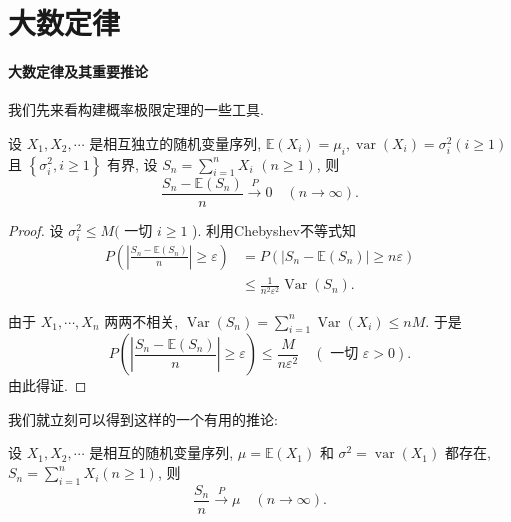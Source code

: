 \section{大数定律}
\paragraph{大数定律及其重要推论}

我们先来看构建概率极限定理的一些工具.

\begin{theorem} 
    设 $X_1, X_2, \cdots$ 是相互独立的随机变量序列, $\mathbb{E}\left(X_i\right)=\mu_i, \operatorname{var}\left(X_i\right)=\sigma_i^2(i \geq 1)$ 且 $\left\{\sigma_i^2, i \geq 1\right\}$ 有界, 设 $S_n=\sum_{i=1}^n X_i$ $(n \geq 1)$, 则
$$
\frac{S_n-\mathbb{E}\left(S_n\right)}{n} \stackrel{P}{\longrightarrow} 0 \quad(n \rightarrow \infty) .
$$
\end{theorem}

\begin{proof}
    设 $\sigma_i^2 \leq M($ 一切 $i \geq 1$ ). 利用Chebyshev不等式知
$$
\begin{aligned}
P\left(\left|\frac{S_n-\mathbb{E}\left(S_n\right)}{n}\right| \geq \varepsilon\right) & =P\left(\left|S_n-\mathbb{E}\left(S_n\right)\right| \geq n \varepsilon\right) \\
& \leq \frac{1}{n^2 \varepsilon^2} \operatorname{Var}\left(S_n\right) .
\end{aligned}
$$

由于 $X_1, \cdots, X_n$ 两两不相关, $\operatorname{Var}\left(S_n\right)=\sum_{i=1}^n \operatorname{Var}\left(X_i\right) \leq n M$. 于是
$$
P\left(\left|\frac{S_n-\mathbb{E}\left(S_n\right)}{n}\right| \geq \varepsilon\right) \leq \frac{M}{n \varepsilon^2} \quad(\text { 一切 } \varepsilon>0) .
$$
由此得证. 

\end{proof}

我们就立刻可以得到这样的一个有用的推论: 

\begin{corollary}
    设 $X_1, X_2, \cdots$ 是相互的随机变量序列, $\mu=\mathbb{E}\left(X_1\right)$ 和 $\sigma^2=\operatorname{var}\left(X_1\right)$ 都存在, $S_n=\sum_{i=1}^n X_i(n \geq 1)$, 则
    $$
    \frac{S_n}{n} \stackrel{P}{\longrightarrow} \mu \quad(n \rightarrow \infty) .
    $$
\end{corollary}



